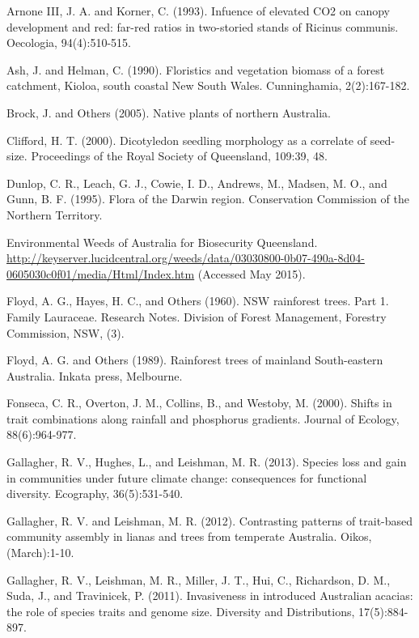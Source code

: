 \documentclass[openright,12pt,a4paper]{memoir}
\begin{document}
\doublespacing
{}



Arnone III, J. A. and Korner, C. (1993). Infuence of elevated CO2 on canopy development and red: far-red ratios in two-storied stands of Ricinus communis. Oecologia, 94(4):510-515.

Ash, J. and Helman, C. (1990). Floristics and vegetation biomass of a forest catchment, Kioloa, south coastal New South Wales. Cunninghamia, 2(2):167-182.

Brock, J. and Others (2005). Native plants of northern Australia.

Clifford, H. T. (2000). Dicotyledon seedling morphology as a correlate of seed-size. Proceedings of the Royal Society of Queensland, 109:39, 48.

Dunlop, C. R., Leach, G. J., Cowie, I. D., Andrews, M., Madsen, M. O., and Gunn, B. F. (1995). Flora of the Darwin region. Conservation Commission of the Northern Territory.

Environmental Weeds of Australia for Biosecurity Queensland. \url{http://keyserver.lucidcentral.org/weeds/data/03030800-0b07-490a-8d04-0605030c0f01/media/Html/Index.htm} (Accessed May 2015).

Floyd, A. G., Hayes, H. C., and Others (1960). NSW rainforest trees. Part 1. Family Lauraceae. Research Notes. Division of Forest Management, Forestry Commission, NSW, (3).

Floyd, A. G. and Others (1989). Rainforest trees of mainland South-eastern Australia. Inkata press, Melbourne.

Fonseca, C. R., Overton, J. M., Collins, B., and Westoby, M. (2000). Shifts in trait combinations along rainfall and phosphorus gradients. Journal of Ecology, 88(6):964-977.

Gallagher, R. V., Hughes, L., and Leishman, M. R. (2013). Species loss and gain in communities under future climate change: consequences for functional diversity. Ecography, 36(5):531-540.

Gallagher, R. V. and Leishman, M. R. (2012). Contrasting patterns of trait-based community assembly in lianas and trees from temperate Australia. Oikos, (March):1-10.

Gallagher, R. V., Leishman, M. R., Miller, J. T., Hui, C., Richardson, D. M., Suda, J., and Travinicek, P. (2011). Invasiveness in introduced Australian acacias: the role of species traits and genome size. Diversity and Distributions, 17(5):884-897.
\end{document}
